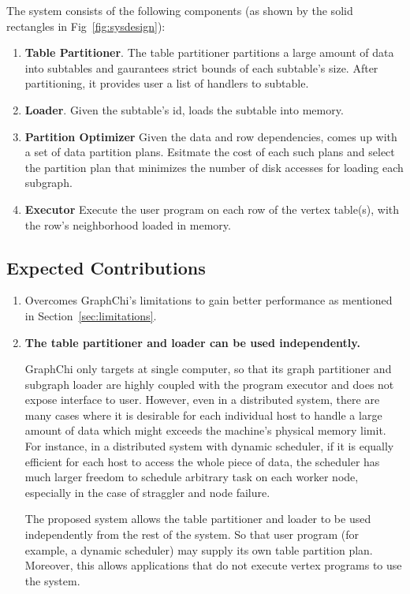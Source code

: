 \documentclass[10pt, twocolumn, a4paper]{article}
\begin{document}
The system consists of the following components (as shown by the solid rectangles in Fig~\ref{fig:sysdesign}):

\begin{enumerate}
\item \textbf{Table Partitioner}. The table partitioner partitions a large amount of data into subtables and gaurantees strict bounds of each subtable's size. After partitioning, it provides user a list of handlers to subtable.
\item \textbf{Loader}. Given the subtable's id, loads the subtable into memory.
\item \textbf{Partition Optimizer} Given the data and row dependencies, comes up with a set of data partition plans. Esitmate the cost of each such plans and select the partition plan that minimizes the number of disk accesses for loading each subgraph.
\item \textbf{Executor} Execute the user program on each row of the vertex table(s), with the row's neighborhood loaded in memory.

\end{enumerate}

\subsection{Expected Contributions}

\begin{enumerate}
\item Overcomes GraphChi's limitations to gain better performance as mentioned in Section~\ref{sec:limitations}.

\item \textbf{The table partitioner and loader can be used independently.}

GraphChi only targets at single computer, so that its graph partitioner and subgraph loader are highly coupled with the program executor and does not expose interface to user. However, even in a distributed system, there are many cases where it is desirable for each individual host to handle a large amount of data which might exceeds the machine's physical memory limit. For instance, in a distributed system with dynamic scheduler, if it is equally efficient for each host to access the whole piece of data, the scheduler has much larger freedom to schedule arbitrary task on each worker node, especially in the case of straggler and node failure.

The proposed system allows the table partitioner and loader to be used independently from the rest of the system. So that user program (for example, a dynamic scheduler) may supply its own table partition plan. Moreover, this allows applications that do not execute vertex programs to use the system.
 
\end{enumerate}
\end{document}
